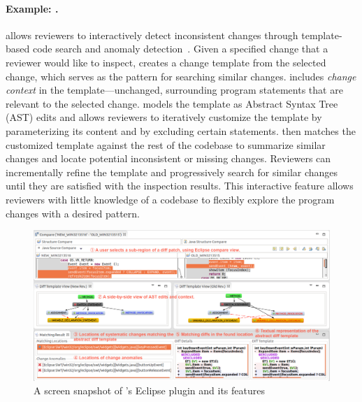 \paragraph{Example: {\critics}.} {\critics} allows reviewers to interactively detect inconsistent changes through template-based code search and anomaly detection~\cite{zhang2015interactive}. Given a specified change that a reviewer would like to inspect, {\critics} creates a change template from the selected change, which serves as the pattern for searching similar changes. {\critics} includes {\em change context} in the template---unchanged, surrounding program statements that are relevant to the selected change. {\critics} models the template as Abstract Syntax Tree (AST) edits and allows reviewers to iteratively customize the template by parameterizing its content and by excluding certain statements. {\critics} then matches the customized template against the rest of the codebase to summarize similar changes and locate potential inconsistent or missing changes. Reviewers can incrementally refine the template and progressively search for similar changes until they are satisfied with the inspection results. This interactive feature allows reviewers with little knowledge of a codebase to flexibly explore the program changes with a desired pattern. %

\begin{figure}[ht]
 \centering
 \includegraphics[width=\textwidth]{images/critics-UI2.pdf}
 \caption{A screen snapshot of {\critics}'s Eclipse plugin and its features}
 \label{fig:critics-UI}
\end{figure}

